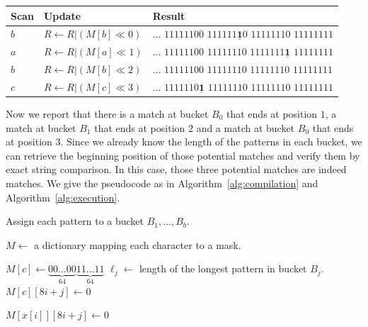 \begin{tabular*}{\textwidth}{lll}
  Scan & Update & Result\\
  \hline
  $b$ & $ R\gets R | (M[b] \ll 0)$ & $\ldots\,\,11111100\,\,111111\underline{\bm{1}}0\,\,11111110\,\,11111111$\\
  $a$ & $ R\gets R | (M[a] \ll 1)$ & $\ldots\,\,11111100\,\,11111110\,\,1111111\underline{\bm{1}}\,\,11111111$\\
  $b$ & $ R\gets R | (M[b] \ll 2)$ & $\ldots\,\,11111100\,\,11111110\,\,11111110\,\,11111111$\\
  $c$ & $ R\gets R | (M[c] \ll 3)$ & $\ldots\,\,1111110\underline{\bm{1}}\,\,11111110\,\,11111110\,\,11111111$
\end{tabular*}

Now we report that there is a match at bucket $B_0$ that ends at position $1$, a match at bucket $B_1$ that ends at position $2$ and a match at bucket $B_0$ that ends at position $3$. Since we already know the length of the patterns in each bucket, we can retrieve the beginning position of those potential matches and verify them by exact string comparison. In this case, those three potential matches are indeed matches. We give the pseudocode as in Algorithm~\ref{alg:compilation} and Algorithm~\ref{alg:execution}.

\begin{algorithm}[H]
  \caption{Compilation phase of the FDR string matcher}
  \label{alg:compilation}
  \begin{algorithmic}[1]
    \State Assign each pattern to a bucket $B_1,\ldots,B_b$.

    \State $M\gets$  a dictionary mapping each character to a mask.

    \State $M[c] \gets \underbrace{00\ldots00}_{64}\underbrace{11\ldots11}_{64}$ 
    \State $\ell_j\gets$ length of the longest pattern in bucket $B_j$.
    \State $M[c][8i+j] \gets 0$ 
    \EndFor
    \EndFor
    \EndFor

    \State $M[x[i]][8i+j] \gets 0$
    \EndFor
    \EndFor
    \EndFor
  \end{algorithmic}
\end{algorithm}

